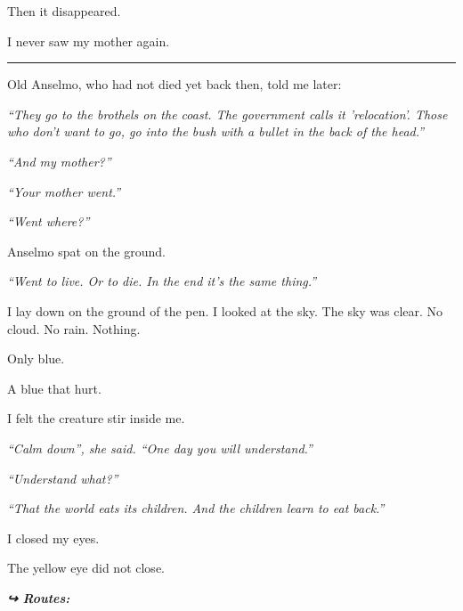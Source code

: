 \noindent Then it disappeared.

\noindent I never saw my mother again.

\vspace{0.5em}\noindent\rule{\textwidth}{0.5pt}\vspace{0.5em}

\noindent Old Anselmo, who had not died yet back then, told me later:

\noindent \textit{\textquotedblleft{}They go to the brothels on the coast. The government calls it 'relocation'. Those who don't want to go, go into the bush with a bullet in the back of the head.\textquotedblright{}}

\noindent \textit{\textquotedblleft{}And my mother?\textquotedblright{}}

\noindent \textit{\textquotedblleft{}Your mother went.\textquotedblright{}}

\noindent \textit{\textquotedblleft{}Went where?\textquotedblright{}}

\noindent Anselmo spat on the ground.

\noindent \textit{\textquotedblleft{}Went to live. Or to die. In the end it's the same thing.\textquotedblright{}}

\noindent I lay down on the ground of the pen. I looked at the sky. The sky was clear. No cloud. No rain. Nothing.

\noindent Only blue.

\noindent A blue that hurt.

\noindent I felt the creature stir inside me.

\noindent \textit{\textquotedblleft{}Calm down\textquotedblright{}\textit{, she said. }\textquotedblleft{}One day you will understand.\textquotedblright{}}

\noindent \textit{\textquotedblleft{}Understand what?\textquotedblright{}}

\noindent \textit{\textquotedblleft{}That the world eats its children. And the children learn to eat back.\textquotedblright{}}

\noindent I closed my eyes.

\noindent The yellow eye did not close.

\vspace{0.5em}
\noindent\textit{\textbf{↪ Routes:}  \rotasep {} \rotasep {} \rotasep {}}
